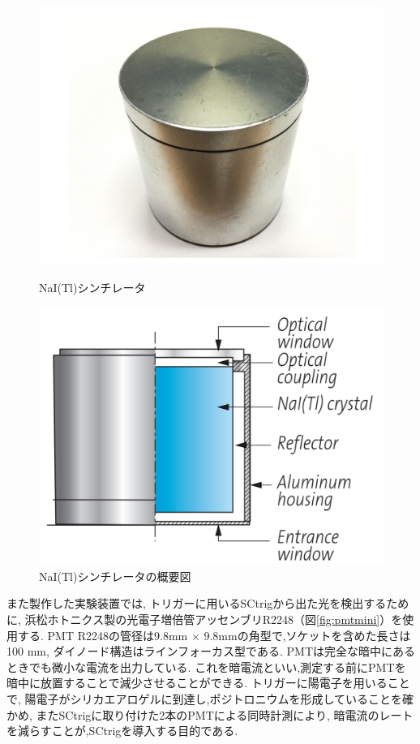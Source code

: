 \begin{figure}[htbp]
\begin{minipage}{0.5\hsize}
\centering
\includegraphics[keepaspectratio,scale=0.35]{fig/ybm/naitl.pdf}
\caption{NaI(Tl)シンチレータ}
\label{fig:naitl}
\end{minipage}
\begin{minipage}{0.5\hsize}
\centering
\includegraphics[keepaspectratio,scale=0.35]{fig/ybm/naitl0.pdf}
	\caption{NaI(Tl)シンチレータの概要図\cite{nai}}
\label{fig:naitl0}
\end{minipage}
\end{figure}

また製作した実験装置では,
トリガーに用いるSCtrigから出た光を検出するために,
浜松ホトニクス製の光電子増倍管アッセンブリR2248（図\ref{fig:pmtmini}）を使用する.
PMT R2248の管径は9.8mm $\times$ 9.8mmの角型で,ソケットを含めた長さは100 mm,
ダイノード構造はラインフォーカス型である.
PMTは完全な暗中にあるときでも微小な電流を出力している.
これを暗電流といい,測定する前にPMTを暗中に放置することで減少させることができる.
トリガーに陽電子を用いることで,
陽電子がシリカエアロゲルに到達し,ポジトロニウムを形成していることを確かめ,
またSCtrigに取り付けた2本のPMTによる同時計測により,
暗電流のレートを減らすことが,SCtrigを導入する目的である.

